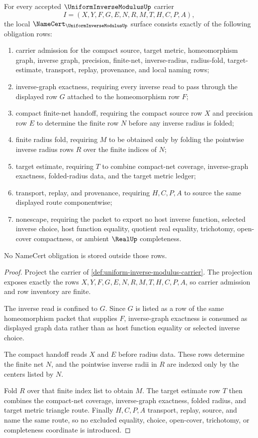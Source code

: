 \begin{theorem}
\label{thm:uniform-inverse-modulus-obligations}
For every accepted $\UniformInverseModulusUp$ carrier
$$
I=(X,Y,F,G,E,N,R,M,T,H,C,P,A),
$$
the local $\NameCert_{\UniformInverseModulusUp}$ surface consists exactly of the following obligation rows:
\begin{enumerate}
\item carrier admission for the compact source, target metric, homeomorphism graph, inverse graph, precision, finite-net, inverse-radius, radius-fold, target-estimate, transport, replay, provenance, and local naming rows;
\item inverse-graph exactness, requiring every inverse read to pass through the displayed row $G$ attached to the homeomorphism row $F$;
\item compact finite-net handoff, requiring the compact source row $X$ and precision row $E$ to determine the finite row $N$ before any inverse radius is folded;
\item finite radius fold, requiring $M$ to be obtained only by folding the pointwise inverse radius rows $R$ over the finite indices of $N$;
\item target estimate, requiring $T$ to combine compact-net coverage, inverse-graph exactness, folded-radius data, and the target metric ledger;
\item transport, replay, and provenance, requiring $H,C,P,A$ to source the same displayed route componentwise;
\item nonescape, requiring the packet to export no host inverse function, selected inverse choice, host function equality, quotient real equality, trichotomy, open-cover compactness, or ambient $\RealUp$ completeness.
\end{enumerate}
No NameCert obligation is stored outside those rows.
\end{theorem}
\begin{proof}
Project the carrier of \autoref{def:uniform-inverse-modulus-carrier}. The projection exposes exactly the rows $X,Y,F,G,E,N,R,M,T,H,C,P,A$, so carrier admission and row inventory are finite.

The inverse read is confined to $G$. Since $G$ is listed as a row of the same homeomorphism packet that supplies $F$, inverse-graph exactness is consumed as displayed graph data rather than as host function equality or selected inverse choice.

The compact handoff reads $X$ and $E$ before radius data. These rows determine the finite net $N$, and the pointwise inverse radii in $R$ are indexed only by the centers listed by $N$.

Fold $R$ over that finite index list to obtain $M$. The target estimate row $T$ then combines the compact-net coverage, inverse-graph exactness, folded radius, and target metric triangle route. Finally $H,C,P,A$ transport, replay, source, and name the same route, so no excluded equality, choice, open-cover, trichotomy, or completeness coordinate is introduced.
\end{proof}


